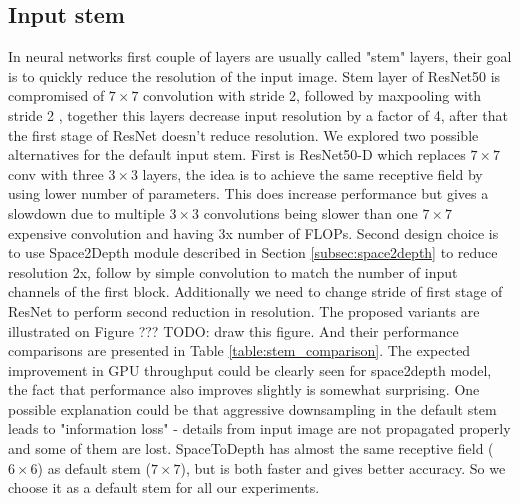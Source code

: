 \subsection{Input stem}

In neural networks first couple of layers are usually called "stem" layers, their goal is to quickly reduce the resolution of the input image. Stem layer of ResNet50 is compromised of $7 \times 7$ convolution with stride 2, followed by maxpooling with stride 2 \cite{he2016deep_resnetv1}, together this layers decrease input resolution by a factor of 4, after that the first stage of ResNet doesn't reduce resolution. We explored two possible alternatives for the default input stem. First is ResNet50-D which replaces $7 \times 7$ conv with three $3 \times 3$ layers, the idea is to achieve the same receptive field by using lower number of parameters. This does increase performance but gives a slowdown due to multiple $3 \times 3$ convolutions being slower than one $7 \times 7$ expensive convolution and having 3x number of FLOPs. Second design choice is to use Space2Depth module described in Section \ref{subsec:space2depth} to reduce resolution 2x, follow by simple convolution to match the number of input channels of the first block. Additionally we need to change stride of first stage of ResNet to perform second reduction in resolution. The proposed variants are illustrated on Figure ??? TODO: draw this figure.
And their performance comparisons are presented in Table \ref{table:stem_comparison}. The expected improvement in GPU throughput could be clearly seen for space2depth model, the fact that performance also improves slightly is somewhat surprising. One possible explanation could be that aggressive downsampling in the default stem leads to "information loss" - details from input image are not propagated properly and some of them are lost. SpaceToDepth has almost the same receptive field ($6 \times 6$) as default stem ($ 7 \times 7$), but is both faster and gives better accuracy. So we choose it as a default stem for all our experiments.



